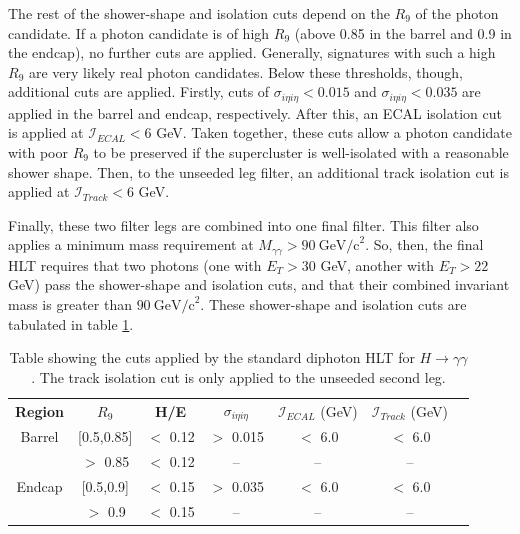 \documentclass[12pt]{ucsddissertation}
\begin{document}
The rest of the shower-shape and isolation cuts depend on the $R_9$ of the photon candidate. If a photon candidate is of high $R_9$ (above 0.85 in the barrel and 0.9 in the endcap), no further cuts are applied. Generally, signatures with such a high $R_9$ are very likely real photon candidates. Below these thresholds, though, additional cuts are applied. Firstly, cuts of $\sigma_{i \eta i \eta} < 0.015$ and $\sigma_{i \eta i \eta} < 0.035$ are applied in the barrel and endcap, respectively. After this, an ECAL isolation cut is applied at $\mathcal{I}_{ECAL} < 6$ GeV. Taken together, these cuts allow a photon candidate with poor $R_9$ to be preserved if the supercluster is well-isolated with a reasonable shower shape. Then, to the unseeded leg filter, an additional track isolation cut is applied at $\mathcal{I}_{Track} < 6$ GeV.

Finally, these two filter legs are combined into one final filter. This filter also applies a minimum mass requirement at $M_{\gamma \gamma} > 90 \ \mathrm{GeV/c}^2$. So, then, the final HLT requires that two photons (one with $E_T > 30$ GeV, another with $E_T > 22$ GeV) pass the shower-shape and isolation cuts, and that their combined invariant mass is greater than $90 \ \mathrm{GeV/c}^2$. These shower-shape and isolation cuts are tabulated in table \ref{tab:sHLTCuts}.
\begin{table}
	\centering
	\caption{Table showing the cuts applied by the standard diphoton HLT for $H \rightarrow \gamma \gamma$. The track isolation cut is only applied to the unseeded second leg.}
	\label{tab:sHLTCuts}
	\begin{tabular}{| c | c | c | c | c | c | c |} 
		\hline
		\textbf{Region} & \textbf{$R_9$} & \textbf{H/E} & \textbf{$\sigma_{i \eta i \eta}$} & \textbf{$\mathcal{I}_{ECAL}$} (GeV) & \textbf{$\mathcal{I}_{Track}$} (GeV)\\
		\Xhline{2pt}
		Barrel & [0.5,0.85] & $<$ 0.12 & $>$ 0.015 & $<$ 6.0 & $<$ 6.0\\
		 & $>$ 0.85 & $<$ 0.12 & -- & -- & --\\
		Endcap & [0.5,0.9] & $<$ 0.15 & $>$ 0.035 & $<$ 6.0 & $<$ 6.0\\
		 & $>$ 0.9 & $<$ 0.15 & -- & -- & --\\ 
		\hline
	\end{tabular}
\end{table}
\end{document}
